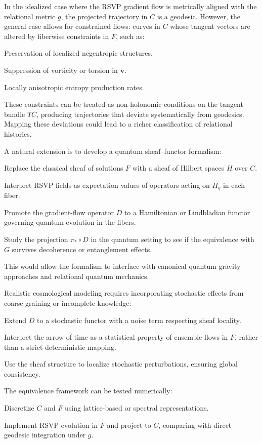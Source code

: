 \documentclass[11pt]{article}
\theoremstyle{plain}
\theoremstyle{definition}
\begin{document}
In the idealized case where the RSVP gradient flow is metrically aligned with the relational metric $g$, the projected trajectory in $C$ is a geodesic. However, the general case allows for constrained flows: curves in $C$ whose tangent vectors are altered by fiberwise constraints in $F$, such as:

Preservation of localized negentropic structures.

Suppression of vorticity or torsion in $\mathbf{v}$.

Locally anisotropic entropy production rates.

These constraints can be treated as non-holonomic conditions on the tangent bundle $TC$, producing trajectories that deviate systematically from geodesics. Mapping these deviations could lead to a richer classification of relational histories.

A natural extension is to develop a quantum sheaf–functor formalism:

Replace the classical sheaf of solutions $F$ with a sheaf of Hilbert spaces $H$ over $C$.

Interpret RSVP fields as expectation values of operators acting on $H_q$ in each fiber.

Promote the gradient-flow operator $D$ to a Hamiltonian or Lindbladian functor governing quantum evolution in the fibers.

Study the projection $\pi_* \circ D$ in the quantum setting to see if the equivalence with $G$ survives decoherence or entanglement effects.

This would allow the formalism to interface with canonical quantum gravity approaches and relational quantum mechanics.

Realistic cosmological modeling requires incorporating stochastic effects from coarse-graining or incomplete knowledge:

Extend $D$ to a stochastic functor with a noise term respecting sheaf locality.

Interpret the arrow of time as a statistical property of ensemble flows in $F$, rather than a strict deterministic mapping.

Use the sheaf structure to localize stochastic perturbations, ensuring global consistency.

The equivalence framework can be tested numerically:

Discretize $C$ and $F$ using lattice-based or spectral representations.

Implement RSVP evolution in $F$ and project to $C$, comparing with direct geodesic integration under $g$.
\end{document}
